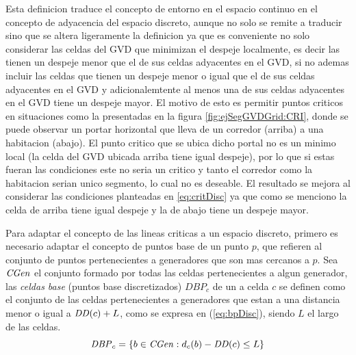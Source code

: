 Esta definicion traduce el concepto de entorno en el espacio continuo
en el concepto de adyacencia del espacio discreto, aunque no solo se remite a
traducir sino que se altera ligeramente la definicion ya que es conveniente no
solo considerar las celdas del GVD que minimizan el despeje localmente, es
decir las tienen un despeje menor que el de sus celdas adyacentes en el GVD, si
no ademas incluir las celdas que tienen un despeje menor o igual que el de sus
celdas adyacentes en el GVD y adicionalemtente al menos una de sus celdas
adyacentes en el GVD tiene un despeje mayor.
El motivo de esto es permitir puntos criticos en situaciones como la
presentadas en la figura \ref{fig:ejSegGVDGrid:CRI}, donde se puede observar un
portar horizontal que lleva de un corredor (arriba) a una habitacion (abajo).
El punto critico que se ubica dicho portal no es un minimo local (la celda del
GVD ubicada arriba tiene igual despeje), por lo que si estas fueran las
condiciones este no seria un critico y tanto el corredor como la habitacion
serian unico segmento, lo cual no es deseable. El resultado se mejora al
considerar las condiciones planteadas en \ref{eq:critDisc} ya que como se
menciono la celda de arriba tiene igual despeje y la de abajo tiene un despeje
mayor. 



Para adaptar el concepto de las lineas criticas a un espacio discreto, primero
es necesario adaptar el concepto de puntos base de un punto $p$, que refieren
al conjunto de puntos pertenecientes a generadores que son mas cercanos a $p$.
Sea $\mathit{CGen}$ el conjunto formado por todas las celdas pertenecientes a
algun generador, las \emph{celdas base} (puntos base discretizados) $DBP_c$ de
un a celda $c$ se definen como el conjunto de las celdas pertenecientes a
generadores que estan a una distancia menor o igual a $\mathit{DD}(c)+L$, como se
expresa en (\ref{eq:bpDisc}), siendo $L$ el largo de las celdas.
\begin{equation}
\mathit{DBP}_c = \{ b \in \mathit{CGen} : d_c(b) - \mathit{DD}(c) \leq L\}
\label{eq:bpDisc}
\end{equation}

